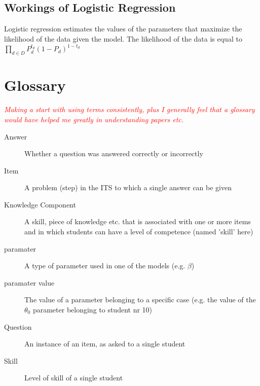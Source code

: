 \documentclass{scrartcl}
\newcommand\todo[1]{\textit{\textcolor{red}{#1}}}
\begin{document}
\subsection{Workings of Logistic Regression}
Logistic regression estimates the values of the parameters that maximize the likelihood of the data given the model. The likelihood of the data is equal to $\prod_{d \in D} P_{d}^{t_d}  (1- P_{d})^{1-t_d} $

\pagebreak 
\section{Glossary}
\todo{
Making a start with using terms consistently, plus I generally feel that a glossary would have helped me greatly in understanding papers etc.}
\begin{description}
\item[Answer]Whether a question was answered correctly or incorrectly
  \item[Item] A problem (step) in the ITS to which a single answer can be given
  \item[Knowledge Component] A skill, piece of knowledge etc. that is associated with one or more items and in which students can have a level of competence (named 'skill' here)
  \item[paramater] A type of parameter used in one of the models (e.g. $\beta$)
  \item[paramater value] The value of a parameter belonging to a specific case (e.g. the value of the $\theta_{0}$ parameter belonging to student nr 10)
  \item[Question] An instance of an item, as asked to a single student
  \item[Skill] Level of skill of a single student
\end{description}
\end{document}

